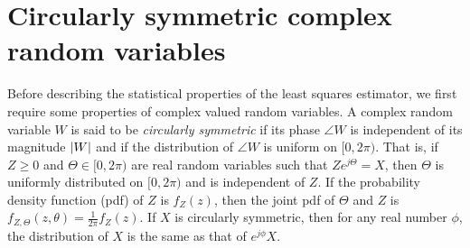 \documentclass{article}
\begin{document}



\section{Circularly symmetric complex random variables}\label{sec:circ-symm-compl}

Before describing the statistical properties of the least squares estimator, we first require some properties of complex valued random variables.  
A complex random variable $W$ is said to be \emph{circularly symmetric} if its phase $\angle{W}$ is independent of its magnitude ${\left\vert W \right\vert}$ and if the distribution of $\angle{W}$ is uniform on $[0,2\pi)$.  That is, if $Z \geq 0$ and $\Theta \in [0,2\pi)$ are real random variables such that $Ze^{j\Theta} = X$, then $\Theta$ is uniformly distributed on $[0,2\pi)$ and is independent of $Z$.  If the probability density function (pdf) of $Z$ is $f_Z(z)$, then the joint pdf of $\Theta$ and $Z$ is $f_{Z,\Theta}(z,\theta) = \frac{1}{2\pi}f_Z(z)$.
If $X$ is circularly symmetric, then for any real number $\phi$, the distribution of $X$ is the same as that of $e^{j\phi}X$.  %
\end{document}
